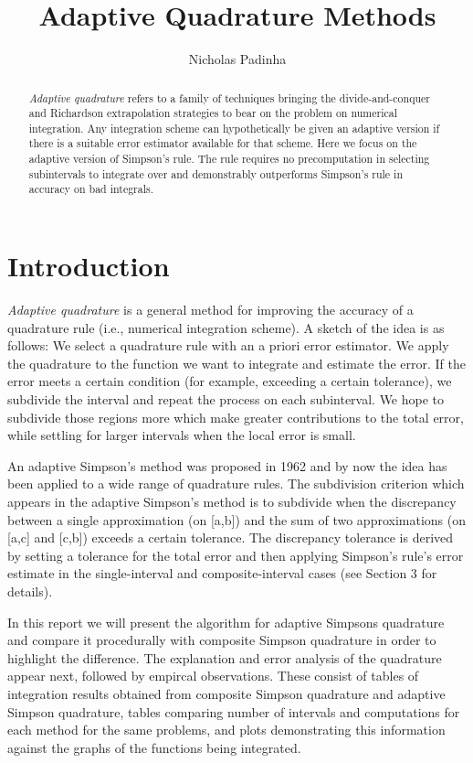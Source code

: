 \documentclass[11pt]{article} %
\title{Adaptive Quadrature Methods}
\author{Nicholas Padinha}
\begin{document}
\maketitle
\begin{abstract}
\textit{Adaptive quadrature} refers to a family of techniques bringing the divide-and-conquer and Richardson extrapolation strategies to bear on the problem on numerical integration. Any integration scheme can hypothetically be given an adaptive version if there is a suitable error estimator available for that scheme. Here we focus on the adaptive version of Simpson's rule. The rule requires no precomputation in selecting subintervals to integrate over and demonstrably outperforms Simpson's rule in accuracy on bad integrals.
\end{abstract}
\listoffigures

\section{Introduction}

\textit{Adaptive quadrature} is a general method for improving the accuracy of a quadrature rule (i.e., numerical integration scheme). A sketch of the idea is as follows: We select a quadrature rule with an a priori error estimator. We apply the quadrature to the function we want to integrate and estimate the error. If the error meets a certain condition (for example, exceeding a certain tolerance), we subdivide the interval and repeat the process on each subinterval. We hope to subdivide those regions more which make greater contributions to the total error, while settling for larger intervals when the local error is small.

An adaptive Simpson's method was proposed in 1962 and by now the idea has been applied to a wide range of quadrature rules. The subdivision criterion which appears in the adaptive Simpson's method is to subdivide when the discrepancy between a single approximation (on [a,b]) and the sum of two approximations (on [a,c] and [c,b]) exceeds a certain tolerance. The discrepancy tolerance is derived by setting a tolerance for the total error and then applying Simpson's rule's error estimate in the single-interval and composite-interval cases (see Section 3 for details).

In this report we will present the algorithm for adaptive Simpsons quadrature and compare it procedurally with composite Simpson quadrature in order to highlight the difference. The explanation and error analysis of the quadrature appear next, followed by empircal observations. These consist of tables of integration results obtained from composite Simpson quadrature and adaptive Simpson quadrature, tables comparing number of intervals and computations for each method for the same problems, and plots demonstrating this information against the graphs of the functions being integrated.
\end{document}
